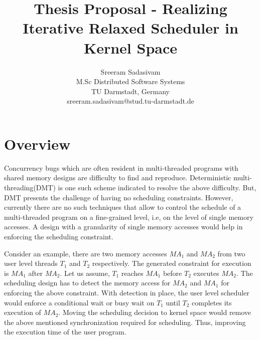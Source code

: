 \documentclass[12pt]{article}
\begin{document}
\title{\vspace{-3.5cm} Thesis Proposal - Realizing Iterative Relaxed Scheduler in Kernel Space}


\author{
		 Sreeram Sadasivam\\
		M.Sc Distributed Software Systems\\
		TU Darmstadt, Germany\\
		sreeram.sadasivam@stud.tu-darmstadt.de
}

\date{}


\maketitle




\section*{Overview}

Concurrency bugs which are often resident in multi-threaded programs with shared memory designs are difficulty to find and reproduce. 
Deterministic multi-threading(DMT) is one such scheme indicated to resolve the above difficulty. 
But, DMT presents the challenge of having no scheduling constraints.  
However, currently there are no such techniques that allow to control the schedule of a multi-threaded program on a fine-grained level, i.e, on the level of single memory accesses. 
A design with a granularity of single memory accesses would help in enforcing the scheduling constraint. 

Consider an example, there are two memory accesses $MA_{1}$ and $MA_{2}$ from two user level threads $T_{1}$ and $T_{2}$ respectively. 
The generated constraint for execution is $MA_{1}$ after $MA_{2}$. 
Let us assume, $T_{1}$ reaches $MA_{1}$ before $T_{2}$ executes $MA_{2}$. 
The scheduling design has to detect the memory access for $MA_{2}$ and $MA_{1}$ for enforcing the above constraint. 
With detection in place, the user level scheduler would enforce a conditional wait or busy wait on $T_{1}$ until $T_{2}$ completes its execution of $MA_{2}$.  
Moving the scheduling decision to kernel space would remove the above mentioned synchronization required for scheduling. 
Thus, improving the execution time of the user program.
\end{document}
